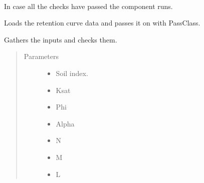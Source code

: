 \documentclass[letterpaper,10pt,english]{sphinxmanual}
\begin{document}
\begin{fulllineitems}
\begin{fulllineitems}
\end{fulllineitems}


\begin{fulllineitems}
\label{\detokenize{cmf:livestock.components.comp_cmf.CMFRetentionCurve.run}}~
\begin{DUlineblock}{0em}
\item[] In case all the checks have passed the component runs.
\item[] Loads the retention curve data and passes it on with PassClass.
\end{DUlineblock}

\end{fulllineitems}


\begin{fulllineitems}
\label{\detokenize{cmf:livestock.components.comp_cmf.CMFRetentionCurve.run_checks}}
Gathers the inputs and checks them.
\begin{quote}\begin{description}
\item[{Parameters}] \leavevmode\begin{itemize}
\item {} 
 \textendash{} Soil index.

\item {} 
 \textendash{} Ksat

\item {} 
 \textendash{} Phi

\item {} 
 \textendash{} Alpha

\item {} 
 \textendash{} N

\item {} 
 \textendash{} M

\item {} 
 \textendash{} L

\end{itemize}

\end{description}\end{quote}

\end{fulllineitems}


\end{fulllineitems}
\end{document}
